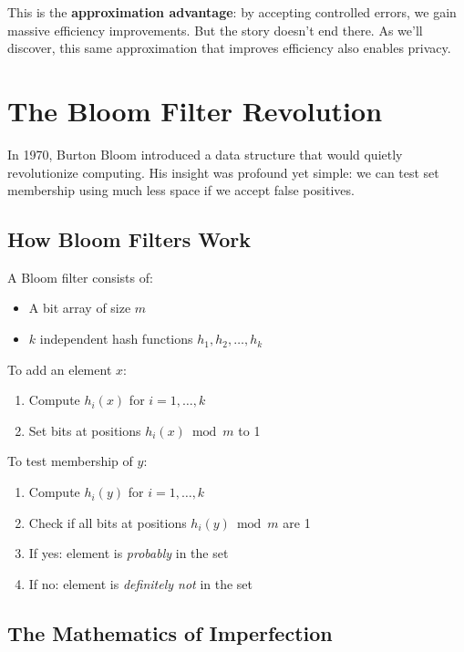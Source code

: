 This is the \textbf{approximation advantage}: by accepting controlled errors, we gain massive efficiency improvements. But the story doesn't end there. As we'll discover, this same approximation that improves efficiency also enables privacy.

\section{The Bloom Filter Revolution}

In 1970, Burton Bloom introduced a data structure that would quietly revolutionize computing. His insight was profound yet simple: we can test set membership using much less space if we accept false positives.

\subsection{How Bloom Filters Work}

A Bloom filter consists of:
\begin{itemize}
    \item A bit array of size $m$
    \item $k$ independent hash functions $h_1, h_2, \ldots, h_k$
\end{itemize}

To add an element $x$:
\begin{enumerate}
    \item Compute $h_i(x)$ for $i = 1, \ldots, k$
    \item Set bits at positions $h_i(x) \bmod m$ to 1
\end{enumerate}

To test membership of $y$:
\begin{enumerate}
    \item Compute $h_i(y)$ for $i = 1, \ldots, k$
    \item Check if all bits at positions $h_i(y) \bmod m$ are 1
    \item If yes: element is \emph{probably} in the set
    \item If no: element is \emph{definitely not} in the set
\end{enumerate}

\subsection{The Mathematics of Imperfection}

